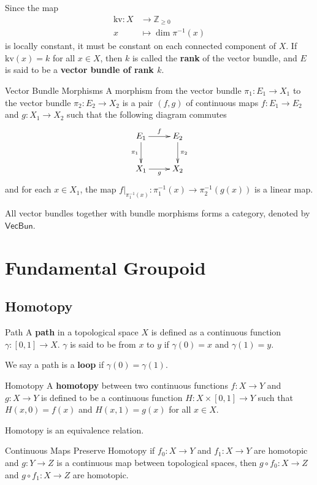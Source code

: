 \documentclass{report}
\begin{document}
Since the map
\[
	\begin{aligned}
		\mathrm{kv}:X & \longrightarrow \mathbb{Z}_{\ge 0} \\
		x             & \longmapsto \dim \pi^{-1}(x)
	\end{aligned}
\]
is locally constant, it must be constant on each connected component of $X$. If $\mathrm{kv}(x)=k$ for all $x\in X$, then $k$ is called the \textbf{rank} of the vector bundle, and $E$ is said to be a \textbf{vector bundle of rank $k$}.

\begin{definition}{Vector Bundle Morphisms}{}
	A morphism from the vector bundle $\pi_1: E_1\to X_1$ to the vector bundle $\pi_2: E_2\to X_2$ is a pair $(f,g)$ of continuous maps $f:E_1\to E_2$ and $g:X_1\to X_2$ such that the following diagram commutes
	\[\xymatrix{
			E_1\ar[d]_{\pi_1}\ar[r]^{f}  & E_2\ar[d]^{\pi_2}\\
			X_1\ar[r]_{g}&X_2
		}\]
	and for each $x\in X_1$, the map $\left.f\right|_{\pi_1^{-1}(x)}:\pi_1^{-1}(x)\to \pi_2^{-1}(g(x))$ is a linear map.
\end{definition}


All vector bundles together with bundle morphisms forms a category, denoted by $\mathsf{VecBun}$.

\chapter{Fundamental Groupoid}
\section{Homotopy}
\begin{definition}{Path}{}
	A \textbf{path} in a topological space $X$ is defined as a continuous function $\gamma:[0,1]\to X$. $\gamma$ is said to be from $x$ to $y$ if $\gamma(0)=x$ and $\gamma(1)=y$.
\end{definition}

We say a path is a \textbf{loop} if $\gamma(0)=\gamma(1)$.

\begin{definition}{Homotopy}{}
	A \textbf{homotopy} between two continuous functions $f:X\to Y$ and $g:X\to Y$ is defined to be a continuous function $H: X \times[0,1] \rightarrow Y$ such that $H(x, 0)=f(x)$ and $H(x, 1)=g(x)$ for all $x \in X$.
\end{definition}

Homotopy is an equivalence relation.
\begin{proposition}{Continuous Maps Preserve Homotopy}{}
	if $f_0:X\to Y$ and $f_1:X\to Y$ are homotopic and $g:Y\to Z$ is a continuous map between topological spaces, then $g\circ f_0:X\to Z$ and $g\circ f_1:X\to Z$ are homotopic.
\end{proposition}
\end{document}
